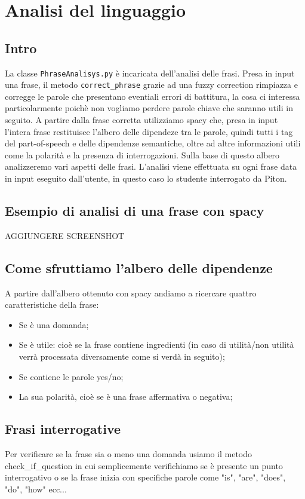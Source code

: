 \section{Analisi del linguaggio}
\subsection{Intro}
La classe \texttt{PhraseAnalisys.py} è incaricata dell'analisi delle frasi.
Presa in input una frase, il metodo \texttt{correct\_phrase} grazie ad una fuzzy correction rimpiazza e corregge le parole che presentano eventiali errori di battitura, la cosa ci interessa particolarmente poichè non vogliamo perdere parole chiave che saranno utili in seguito.
A partire dalla frase corretta  utilizziamo spacy che, presa in input l'intera frase restituisce l'albero delle dipendeze tra le parole, quindi tutti i tag del part-of-speech e delle dipendenze semantiche, oltre ad altre informazioni utili come la polarità e la presenza di interrogazioni. Sulla base di questo albero analizzeremo vari aspetti delle frasi. L'analisi viene effettuata su ogni frase data in input eseguito dall'utente, in questo caso lo studente interrogato da Piton.

\subsection{Esempio di analisi di una frase con spacy}
AGGIUNGERE SCREENSHOT
\subsection{Come sfruttiamo l'albero delle dipendenze}
A partire dall'albero ottenuto con spacy andiamo a ricercare quattro caratteristiche della frase:
\begin{itemize}
    \item Se è una domanda;
    \item Se è utile: cioè se la frase contiene ingredienti (in caso di utilità/non utilità verrà processata diversamente come si verdà in seguito);
    \item Se contiene le parole yes/no;
    \item La sua polarità, cioè se è una frase affermativa o negativa;
\end{itemize}
\subsection{Frasi interrogative}
Per verificare se la frase sia o meno una domanda usiamo il metodo check\_if\_question in cui semplicemente verifichiamo se è presente un punto interrogativo o se la frase inizia con specifiche parole come "is", "are", "does", "do", "how" ecc...
